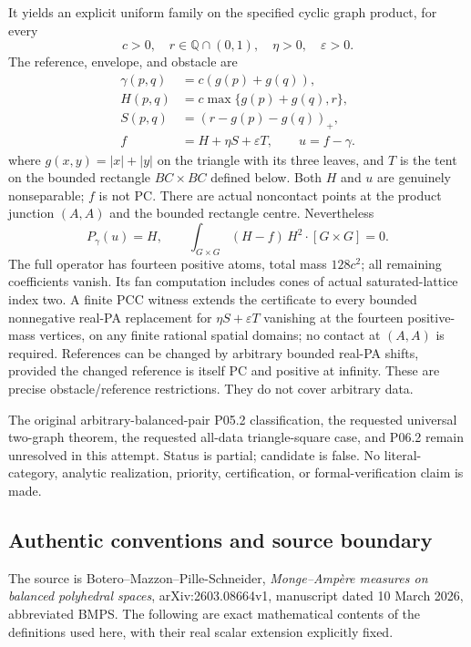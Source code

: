 \documentclass[
  10pt,
]{article}
\begin{document}
It yields an explicit uniform family on the specified cyclic graph
product, for every \[
 c>0,\quad r\in\mathbb{Q}\cap(0,1),\quad\eta>0,\quad\varepsilon>0.
\] The reference, envelope, and obstacle are \[
 \begin{aligned}
 \gamma(p,q)&=c(g(p)+g(q)),\\
 H(p,q)&=c\max\{g(p)+g(q),r\},\\
 S(p,q)&=(r-g(p)-g(q))_+,\\
 f&=H+\eta S+\varepsilon T,\qquad u=f-\gamma.
 \end{aligned}                                                \tag{1}
\] where \(g(x,y)=|x|+|y|\) on the triangle with its three leaves, and
\(T\) is the tent on the bounded rectangle \(BC\times BC\) defined
below. Both \(H\) and \(u\) are genuinely nonseparable; \(f\) is not PC.
There are actual noncontact points at the product junction \((A,A)\) and
the bounded rectangle centre. Nevertheless \[
 P_\gamma(u)=H,\qquad
 \int_{G\times G}(H-f)\,H^2\cdot[G\times G]=0.                \tag{2}
\] The full operator has fourteen positive atoms, total mass \(128c^2\);
all remaining coefficients vanish. Its fan computation includes cones of
actual saturated-lattice index two. A finite PCC witness extends the
certificate to every bounded nonnegative real-PA replacement for
\(\eta S+\varepsilon T\) vanishing at the fourteen positive-mass
vertices, on any finite rational spatial domains; no contact at
\((A,A)\) is required. References can be changed by arbitrary bounded
real-PA shifts, provided the changed reference is itself PC and positive
at infinity. These are precise obstacle/reference restrictions. They do
not cover arbitrary data.

The original arbitrary-balanced-pair P05.2 classification, the requested
universal two-graph theorem, the requested all-data triangle-square
case, and P06.2 remain unresolved in this attempt. Status is partial;
candidate is false. No literal-category, analytic realization, priority,
certification, or formal-verification claim is made.

\subsection{Authentic conventions and source
boundary}\label{authentic-conventions-and-source-boundary}

The source is Botero--Mazzon--Pille-Schneider, \emph{Monge--Ampère
measures on balanced polyhedral spaces}, arXiv:2603.08664v1, manuscript
dated 10 March 2026, abbreviated BMPS. The following are exact
mathematical contents of the definitions used here, with their real
scalar extension explicitly fixed.
\end{document}
